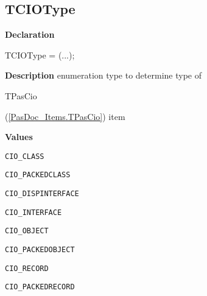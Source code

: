 \documentclass{report}
\newif\ifpdf
\begin{document}
\subsection*{TCIOType}
\fi
\label{PasDoc_Items-TCIOType}
\begin{list}{}{
\setlength{\itemindent}{0cm}
\setlength{\listparindent}{0cm}
\setlength{\leftmargin}{\evensidemargin}
\addtolength{\leftmargin}{\tmplength}
\settowidth{\labelsep}{X}
\addtolength{\leftmargin}{\labelsep}
\setlength{\labelwidth}{\tmplength}
}
\item[\textbf{Declaration}\hfill]
\ifpdf
\begin{flushleft}
\fi
\begin{ttfamily}
TCIOType = (...);\end{ttfamily}

\ifpdf
\end{flushleft}
\fi

\par
\item[\textbf{Description}]
enumeration type to determine type of \begin{ttfamily}TPasCio\end{ttfamily}(\ref{PasDoc_Items.TPasCio}) item\item[\textbf{Values}]
\begin{description}
\item[\texttt{CIO{\_}CLASS}] \label{PasDoc_Items-CIO_CLASS}
\index{}
 
\item[\texttt{CIO{\_}PACKEDCLASS}] \label{PasDoc_Items-CIO_PACKEDCLASS}
\index{}
 
\item[\texttt{CIO{\_}DISPINTERFACE}] \label{PasDoc_Items-CIO_DISPINTERFACE}
\index{}
 
\item[\texttt{CIO{\_}INTERFACE}] \label{PasDoc_Items-CIO_INTERFACE}
\index{}
 
\item[\texttt{CIO{\_}OBJECT}] \label{PasDoc_Items-CIO_OBJECT}
\index{}
 
\item[\texttt{CIO{\_}PACKEDOBJECT}] \label{PasDoc_Items-CIO_PACKEDOBJECT}
\index{}
 
\item[\texttt{CIO{\_}RECORD}] \label{PasDoc_Items-CIO_RECORD}
\index{}
 
\item[\texttt{CIO{\_}PACKEDRECORD}] \label{PasDoc_Items-CIO_PACKEDRECORD}
\index{}
 
\end{description}


\end{list}
\ifpdf
\end{document}

